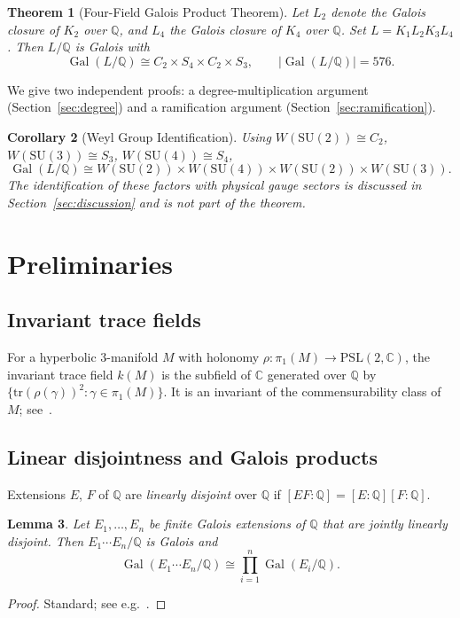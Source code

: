 \documentclass[12pt]{amsart}
\newtheorem{theorem}{Theorem}[section]
\newtheorem{lemma}[theorem]{Lemma}
\newtheorem{corollary}[theorem]{Corollary}
\DeclareMathOperator{\Gal}{Gal}
\newcommand{\Q}{\mathbb{Q}}
\newcommand{\C}{\mathbb{C}}
\begin{document}
\begin{theorem}[Four-Field Galois Product Theorem]\label{thm:main}
Let $L_2$ denote the Galois closure of $K_2$ over $\Q$, and $L_4$ the
Galois closure of $K_4$ over $\Q$. Set $L = K_1 L_2 K_3 L_4$. Then
$L/\Q$ is Galois with
\[
\Gal(L/\Q)\cong C_2\times S_4\times C_2\times S_3,\qquad|\Gal(L/\Q)|=576.
\]
\end{theorem}

We give two independent proofs: a degree-multiplication argument
(Section~\ref{sec:degree}) and a ramification argument
(Section~\ref{sec:ramification}).

\begin{corollary}[Weyl Group Identification]\label{cor:weyl}
Using $W(\mathrm{SU}(2))\cong C_2$, $W(\mathrm{SU}(3))\cong S_3$,
$W(\mathrm{SU}(4))\cong S_4$,
\[
\Gal(L/\Q)\cong W(\mathrm{SU}(2))\times W(\mathrm{SU}(4))\times
W(\mathrm{SU}(2))\times W(\mathrm{SU}(3)).
\]
The identification of these factors with physical gauge sectors is discussed
in Section~\ref{sec:discussion} and is not part of the theorem.
\end{corollary}

\section{Preliminaries}\label{sec:prelim}

\subsection{Invariant trace fields}
For a hyperbolic 3-manifold $M$ with holonomy
$\rho\colon\pi_1(M)\to\mathrm{PSL}(2,\C)$, the invariant trace field
$k(M)$ is the subfield of $\C$ generated over $\Q$ by
$\{\mathrm{tr}(\rho(\gamma))^2:\gamma\in\pi_1(M)\}$.
It is an invariant of the commensurability class of $M$;
see~\cite[Chapter~3]{MR}.

\subsection{Linear disjointness and Galois products}
Extensions $E$, $F$ of $\Q$ are \emph{linearly disjoint} over $\Q$ if
$[EF:\Q]=[E:\Q][F:\Q]$.

\begin{lemma}\label{lem:product}
Let $E_1,\ldots,E_n$ be finite Galois extensions of $\Q$ that are jointly
linearly disjoint. Then $E_1\cdots E_n/\Q$ is Galois and
\[
\Gal(E_1\cdots E_n/\Q)\cong\prod_{i=1}^n\Gal(E_i/\Q).
\]
\end{lemma}
\begin{proof}
Standard; see e.g.~\cite[Theorem~1.14]{Neukirch}.
\end{proof}
\end{document}
